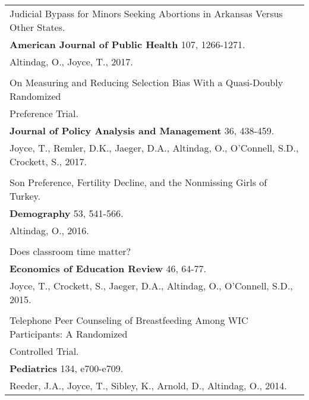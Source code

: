 \documentclass[12 pt]{article}
\begin{document}
\begin{longtable}{ccccc}
\\

   \multicolumn{5}{l}{Judicial Bypass for Minors Seeking Abortions in Arkansas Versus Other States.} \\
    \multicolumn{5}{l}{\textbf{American Journal of Public Health} 107, 1266-1271. 
} \\
    \multicolumn{5}{l}{Altindag, O., Joyce, T., 2017.}  \\
 
\\

   \multicolumn{5}{l}{On Measuring and Reducing Selection Bias With a Quasi-Doubly Randomized} \\
      \multicolumn{5}{l}{Preference Trial.} \\
     \multicolumn{5}{l}{\textbf{Journal of Policy Analysis and Management} 36, 438-459. } \\
      \multicolumn{5}{l}{Joyce, T., Remler, D.K., Jaeger, D.A., Altindag, O., O'Connell, S.D., Crockett, S., 2017. } \\

 \\

   \multicolumn{5}{l}{Son Preference, Fertility Decline, and the Nonmissing Girls of Turkey.} \\
     \multicolumn{5}{l}{\textbf{Demography}  53, 541-566. } \\
      \multicolumn{5}{l}{Altindag, O., 2016. } \\

\\
   \multicolumn{5}{l}{Does classroom time matter?} \\
     \multicolumn{5}{l}{\textbf{Economics of Education Review} 46, 64-77. } \\
      \multicolumn{5}{l}{Joyce, T., Crockett, S., Jaeger, D.A., Altindag, O., O'Connell, S.D., 2015.} \\

 \\

   \multicolumn{5}{l}{Telephone Peer Counseling of Breastfeeding Among WIC Participants: A Randomized} \\
      \multicolumn{5}{l}{ Controlled Trial.} \\
     \multicolumn{5}{l}{\textbf{Pediatrics} 134, e700-e709. } \\
      \multicolumn{5}{l}{Reeder, J.A., Joyce, T., Sibley, K., Arnold, D., Altindag, O., 2014. } \\



\end{longtable}
\end{document}
